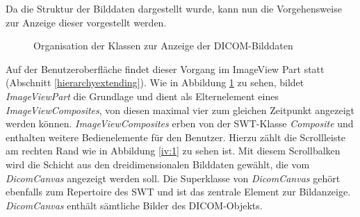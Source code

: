 Da die Struktur der Bilddaten dargestellt wurde, kann nun die Vorgehensweise zur Anzeige dieser vorgestellt werden.\\

\begin{figure}[htbp]
  \vspace{0.5cm}
  \centering
  \caption{Organisation der Klassen zur Anzeige der DICOM-Bilddaten}
  \label{imageview}
  \vspace{0.5cm}
\end{figure}

Auf der Benutzeroberfläche findet dieser Vorgang im ImageView Part statt (Abschnitt \ref{hierarchyextending}). Wie in Abbildung \ref{imageview} zu sehen, bildet \textit{ImageViewPart} die Grundlage und dient als Elternelement eines \textit{ImageViewComposites}, von diesen maximal vier zum gleichen Zeitpunkt angezeigt werden können. \textit{ImageViewComposites} erben von der SWT-Klasse \textit{Composite} und enthalten weitere Bedienelemente für den Benutzer. Hierzu zählt die Scrollleiste am rechten Rand wie in Abbildung \ref{iv:1} zu sehen ist. Mit diesem Scrollbalken wird die Schicht aus den dreidimensionalen Bilddaten gewählt, die vom \textit{DicomCanvas} angezeigt werden soll. Die Superklasse von \textit{DicomCanvas} gehört ebenfalls zum Repertoire des SWT und ist das zentrale Element zur Bildanzeige. \textit{DicomCanvas} enthält sämtliche Bilder des DICOM-Objekts.

